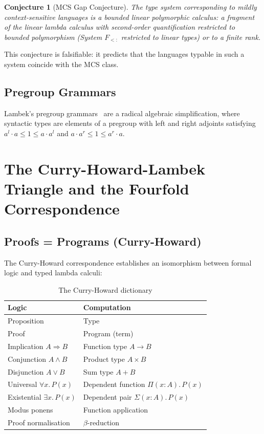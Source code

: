 \documentclass[12pt,a4paper]{article}
\newtheorem{conjecture}{Conjecture}
\begin{document}
\begin{conjecture}[MCS Gap Conjecture]
The type system corresponding to mildly context-sensitive languages is a
\emph{bounded linear polymorphic calculus}: a fragment of the linear lambda
calculus with second-order quantification restricted to bounded polymorphism
(System $F_{<:}$ restricted to linear types) or to a finite rank.
\end{conjecture}

This conjecture is falsifiable: it predicts that the languages typable in such
a system coincide with the MCS class.

\subsection{Pregroup Grammars}

Lambek's pregroup grammars~\cite{Lambek1999,Lambek2008} are a radical
algebraic simplification, where syntactic types are elements of a pregroup
with left and right adjoints satisfying $a^l \cdot a \leq 1 \leq a \cdot a^l$
and $a \cdot a^r \leq 1 \leq a^r \cdot a$.

\section{The Curry-Howard-Lambek Triangle and the Fourfold Correspondence}

\subsection{Proofs = Programs (Curry-Howard)}

The Curry-Howard correspondence establishes an isomorphism between formal
logic and typed lambda calculi:

\begin{table}[ht]
\centering
\caption{The Curry-Howard dictionary}
\label{tab:curryhoward}
\begin{tabular}{@{}ll@{}}
\toprule
Logic & Computation \\
\midrule
Proposition & Type \\
Proof & Program (term) \\
Implication $A \Rightarrow B$ & Function type $A \to B$ \\
Conjunction $A \wedge B$ & Product type $A \times B$ \\
Disjunction $A \vee B$ & Sum type $A + B$ \\
Universal $\forall x.\, P(x)$ & Dependent function $\Pi(x{:}A).\, P(x)$ \\
Existential $\exists x.\, P(x)$ & Dependent pair $\Sigma(x{:}A).\, P(x)$ \\
Modus ponens & Function application \\
Proof normalisation & $\beta$-reduction \\
\bottomrule
\end{tabular}
\end{table}
\end{document}
